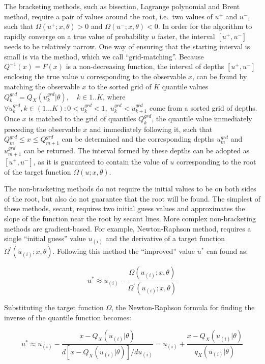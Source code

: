 \documentclass[ba]{imsart}
\numberwithin{equation}{section}
\theoremstyle{plain}
\begin{document}
The bracketing methods, such as bisection, Lagrange polynomial and Brent method, require a pair of values around the root, i.e.~two values of \(u^+\) and \(u^-\), such that \(\Omega(u^+;x,\theta)>0\) and \(\Omega(u^-;x,\theta)<0\). In order for the algorithm to rapidly converge on a true value of probability \(u\) faster, the interval \([u^+, u^-]\) needs to be relatively narrow. One way of ensuring that the starting interval is small is via the method, which we call ``grid-matching''. Because \(Q^{-1}(x)=F(x)\) is a non-decreasing function, the interval of depths \([u^+, u^-]\) enclosing the true value \(u\) corresponding to the observable \(x\), can be found by matching the observable \(x\) to the sorted grid of \(K\) quantile values \(Q^{grd}_k=Q_X(u^{grd}_k|\theta), \quad k \in 1..K\), where \(\forall u^{grd}_k, k \in (1\dots K): 0<u^{grd}_k<1, \; u^{grd}_k<u^{grd}_{k+1}\) come from a sorted grid of depths. Once \(x\) is matched to the grid of quantiles \(Q^{grd}_k\), the quantile value immediately preceding the observable \(x\) and immediately following it, such that \(Q^{grd}_{m} \leq x \leq Q^{grd}_{m+1}\) can be determined and the corresponding depths \(u^{grd}_m\) and \(u^{grd}_{m+1}\) can be returned. The interval formed by these depths can be adopted as \([u^+, u^-]\), as it is guaranteed to contain the value of \(u\) corresponding to the root of the target function \(\Omega(u;x,\theta)\).

The non-bracketing methods do not require the initial values to be on both sides of the root, but also do not guarantee that the root will be found. The simplest of these methods, secant, requires two initial guess values and approximates the slope of the function near the root by secant lines. More complex non-bracketing methods are gradient-based. For example, Newton-Raphson method, requires a single ``initial guess'' value \(u_{(i)}\) and the derivative of a target function \(\Omega^\prime(u_{(i)};x,\theta)\). Following this method the ``improved'' value \(u^*\) can found as:

\[
u^*\approx u_{(i)} -\frac{\Omega(u_{(i)};x,\theta)}{\Omega^\prime(u_{(i)};x,\theta)}
\]

Substituting the target function \(\Omega\), the Newton-Raphson formula for finding the inverse of the quantile function becomes:

\[
u^*\approx u_{(i)}-\frac{x-Q_X(u_{(i)}|\theta)}{d[x-Q_X(u_{(i)}|\theta)]/du_{(i)}}= u_{(i)}+\frac{x-Q_X(u_{(i)}|\theta)}{q_X(u_{(i)}|\theta)}
\]
\end{document}
